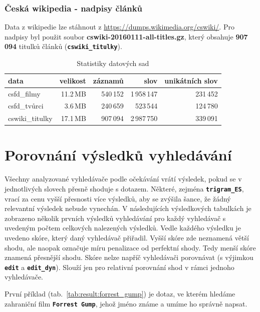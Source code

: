 \documentclass[11pt,letterpaper,oneside,openright]{book}
\newcommand{\bftt}[1]{\texttt{\textbf{#1}}}
\begin{document}
\subsubsection{Česká wikipedia - nadpisy článků}
Data z wikipedie lze stáhnout z \url{https://dumps.wikimedia.org/cswiki/}. Pro
nadpisy byl použit soubor \textbf{cswiki-20160111-all-titles.gz}, který
obsahuje \textbf{907\,094} titulků článků (\bftt{cswiki\_titulky}).


\mbox{}
\begin{tt}
\begin{table}[H]
\centering
\begin{tabulary}{\textwidth}{LRRRR}
\textbf{data} & \textbf{velikost} & \textbf{záznamů} & \textbf{slov} & \textbf{unikátních slov} \\
\hline
csfd\_filmy     & 11.2\,MB & 540\,152 & 1\,958\,147 & 231\,452 \\
csfd\_tvůrci    & 3.6\,MB  & 240\,659 & 523\,544    & 124\,780 \\
cswiki\_titulky & 17.1\,MB & 907\,094 & 2\,987\,750 & 339\,091 \\
\hline
\end{tabulary}
\caption{Statistiky datových sad}
\label{tab:data_stats}
\end{table}
\end{tt}

\section{Porovnání výsledků vyhledávání}
Všechny analyzované vyhledávače podle očekávání vrátí výsledek, pokud se v
jednotlivých slovech přesně shoduje s dotazem. Některé, zejména
\bftt{trigram\_ES}, vrací za cenu vyšší přesnosti více výsledků, aby se zvýšila
šance, že žádný relevantní výsledek nebude vynechán.  V následujících
výsledkových tabulkách je zobrazeno několik prvních výsledků vyhledávání pro
každý vyhledávač s uvedeným počtem celkových nalezených výsledků. Vedle každého
výsledku je uvedeno skóre, který daný vyhledávač přiřadil. Vyšší skóre zde
neznamená větší shodu, ale naopak označuje míru penalizace od perfektní shody.
Tedy menší skóre znamená přesnější shodu. Skóre nelze napříč vyhledávači
porovnávat (s výjimkou \bftt{edit} a \bftt{edit\_dyn}). Slouží jen pro
relativní porovnání shod v rámci jednoho vyhledávače.

\mbox{}\mbox{}

První příklad (tab.~\ref{tab:result:forrest_gump}) je dotaz, ve kterém hledáme
zahraniční film \bftt{Forrest Gump}, jehož jméno známe a umíme ho správně
napsat.
\end{document}
